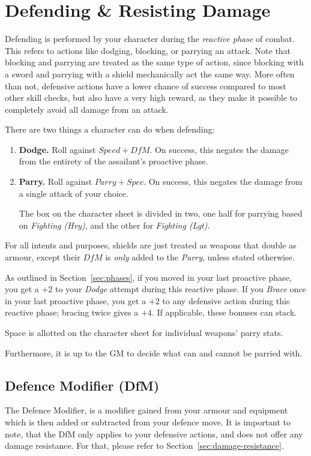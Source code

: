 \section{Defending \& Resisting Damage}\label{sec:defence}
Defending is performed by your character during the \textit{reactive phase} of combat.
This refers to actions like dodging, blocking, or parrying an attack.
Note that blocking and parrying are treated as the same type of action, since blocking with a sword and parrying with a shield mechanically act the same way.
More often than not, defensive actions have a lower chance of success compared to most other skill checks, but also have a very high reward, as they make it possible to completely avoid all damage from an attack.

There are two things a character can do when defending:
\begin{enumerate}
    \item \textbf{Dodge.} 
        Roll against $\mathit{Speed} + \mathit{DfM}$.
        On success, this negates the damage from the entirety of the assailant's proactive phase.
    \item \textbf{Parry.} 
        Roll against $Parry + Spec.$
        On success, this negates the damage from a single attack of your choice.

        The box on the character sheet is divided in two, one half for parrying based on \textit{Fighting (Hvy)}, and the other for \textit{Fighting (Lgt)}.
\end{enumerate}
For all intents and purposes, shields are just treated as weapons that double as armour, except their $\mathit{DfM}$ is \textit{only} added to the \textit{Parry}, unless stated otherwise.

\note As outlined in Section~\ref{sec:phases}, if you moved in your last proactive phase, you get a +2 to your \textit{Dodge} attempt during this reactive phase. 
If you \textit{Brace} once in your last proactive phase, you get a $+2$ to any defensive action during this reactive phase; bracing twice gives a $+4$. 
If applicable, these bonuses can stack.

\note Space is allotted on the character sheet for individual weapons' parry stats.

Furthermore, it is up to the GM to decide what can and cannot be parried with.

\subsection{Defence Modifier (DfM)}\label{sec:defence-modifier}
The Defence Modifier, is a modifier gained from your armour and equipment which is then added or subtracted from your defence move.
It is important to note, that the DfM only applies to your defensive actions, and does not offer any damage resistance. 
For that, please refer to Section~\ref{sec:damage-resistance}.

